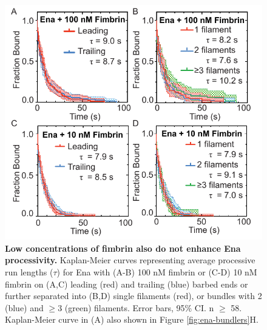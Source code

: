 \begin{figure}[ht]
\centering
\includegraphics[width=12cm]{img/ch02/low_fimbrin.pdf}
\caption[Low concentrations of fimbrin also do not enhance Ena processivity.]{\textbf{Low concentrations of fimbrin also do not enhance Ena processivity.} Kaplan-Meier curves representing average processive run lengths ($\tau$) for Ena with (A-B) 100 nM fimbrin or (C-D) 10 nM fimbrin on (A,C) leading (red) and trailing (blue) barbed ends or further separated into (B,D) single filaments (red), or bundles with 2 (blue) and $\geq$3 (green) filaments. Error bars, 95\% CI. n $\geq$ 58.  Kaplan-Meier curve in (A) also shown in Figure \ref{fig:ena-bundlers}H.}
\label{fig:ena-low-fim}
\end{figure}

